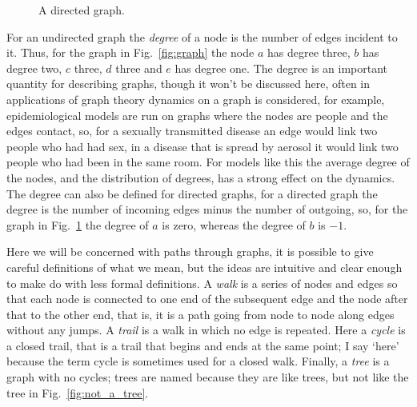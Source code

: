 \documentclass[11pt,a4paper]{scrartcl}
\begin{document}
\begin{figure}
\begin{center}
\end{center}
\caption{A directed graph. \label{fig:dir_graph}}
\end{figure}

For an undirected graph the \textsl{degree} of a node is the number of
edges incident to it. Thus, for the graph in Fig.~\ref{fig:graph} the
node $a$ has degree three, $b$ has degree two, $c$ three, $d$ three
and $e$ has degree one. The degree is an important quantity for
describing graphs, though it won't be discussed here, often in
applications of graph theory dynamics on a graph is considered, for
example, epidemiological models are run on graphs where the nodes are
people and the edges contact, so, for a sexually transmitted disease
an edge would link two people who had had sex, in a disease that is
spread by aerosol it would link two people who had been in the same
room. For models like this the average degree of the nodes, and the
distribution of degrees, has a strong effect on the dynamics. The
degree can also be defined for directed graphs, for a directed graph
the degree is the number of incoming edges minus the number of
outgoing, so, for the graph in Fig.~\ref{fig:dir_graph} the degree of
$a$ is zero, whereas the degree of $b$ is $-1$.

Here we will be concerned with paths through graphs, it is possible to
give careful definitions of what we mean, but the ideas are intuitive
and clear enough to make do with less formal definitions. A
\textsl{walk} is a series of nodes and edges so that each node is
connected to one end of the subsequent edge and the node after that to
the other end, that is, it is a path going from node to node along
edges without any jumps. A \textsl{trail} is a walk in which no edge
is repeated. Here a \textsl{cycle} is a closed trail, that is a trail
that begins and ends at the same point; I say \lq{}here\rq{} because the term
cycle is sometimes used for a closed walk. Finally, a \textsl{tree} is
a graph with no cycles; trees are named because they are like trees, but not like the tree in Fig.~\ref{fig:not_a_tree}.
\end{document}
